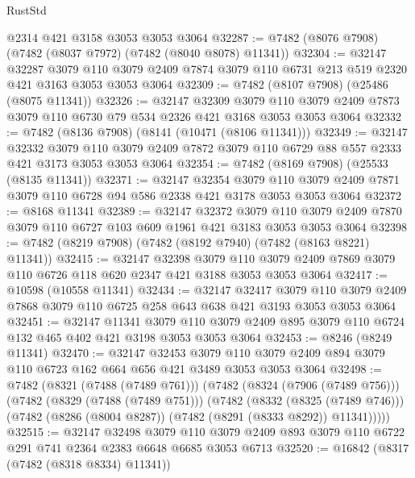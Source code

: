 \begin{lexlean}{RustStd}
\begin{coremodule}
{\begin{coremodule}
{{{{{{{{{{{{{{{{{{{{{{{{{{{{{{{{    @2314
    @421
    @3158
    @3053
    @3053
    @3064
@32287 := @7482 (@8076 @7908) (@7482 (@8037 @7972) (@7482 (@8040 @8078) @11341))
@32304 := @32147
    @32287
    @3079
    @110
    @3079
    @2409
    @7874
    @3079
    @110
    @6731
    @213
    @519
    @2320
    @421
    @3163
    @3053
    @3053
    @3064
@32309 := @7482 (@8107 @7908) (@25486 (@8075 @11341))
@32326 := @32147
    @32309
    @3079
    @110
    @3079
    @2409
    @7873
    @3079
    @110
    @6730
    @79
    @534
    @2326
    @421
    @3168
    @3053
    @3053
    @3064
@32332 := @7482 (@8136 @7908) (@8141 (@10471 (@8106 @11341)))
@32349 := @32147
    @32332
    @3079
    @110
    @3079
    @2409
    @7872
    @3079
    @110
    @6729
    @88
    @557
    @2333
    @421
    @3173
    @3053
    @3053
    @3064
@32354 := @7482 (@8169 @7908) (@25533 (@8135 @11341))
@32371 := @32147
    @32354
    @3079
    @110
    @3079
    @2409
    @7871
    @3079
    @110
    @6728
    @94
    @586
    @2338
    @421
    @3178
    @3053
    @3053
    @3064
@32372 := @8168 @11341
@32389 := @32147
    @32372
    @3079
    @110
    @3079
    @2409
    @7870
    @3079
    @110
    @6727
    @103
    @609
    @1961
    @421
    @3183
    @3053
    @3053
    @3064
@32398 := @7482 (@8219 @7908) (@7482 (@8192 @7940) (@7482 (@8163 @8221) @11341))
@32415 := @32147
    @32398
    @3079
    @110
    @3079
    @2409
    @7869
    @3079
    @110
    @6726
    @118
    @620
    @2347
    @421
    @3188
    @3053
    @3053
    @3064
@32417 := @10598 (@10558 @11341)
@32434 := @32147
    @32417
    @3079
    @110
    @3079
    @2409
    @7868
    @3079
    @110
    @6725
    @258
    @643
    @638
    @421
    @3193
    @3053
    @3053
    @3064
@32451 := @32147
    @11341
    @3079
    @110
    @3079
    @2409
    @895
    @3079
    @110
    @6724
    @132
    @465
    @402
    @421
    @3198
    @3053
    @3053
    @3064
@32453 := @8246 (@8249 @11341)
@32470 := @32147
    @32453
    @3079
    @110
    @3079
    @2409
    @894
    @3079
    @110
    @6723
    @162
    @664
    @656
    @421
    @3489
    @3053
    @3053
    @3064
@32498 := @7482
    (@8321 (@7488 (@7489 @761)))
    (@7482
      (@8324 (@7906 (@7489 @756)))
      (@7482
        (@8329 (@7488 (@7489 @751)))
        (@7482
          (@8332 (@8325 (@7489 @746)))
          (@7482 (@8286 (@8004 @8287)) (@7482 (@8291 (@8333 @8292)) @11341)))))
@32515 := @32147
    @32498
    @3079
    @110
    @3079
    @2409
    @893
    @3079
    @110
    @6722
    @291
    @741
    @2364
    @2383
    @6648
    @6685
    @3053
    @6713
@32520 := @16842 (@8317 (@7482 (@8318 @8334) @11341))
}}}}}}}}}}}}}}}}}}}}}}}}}}}}}}}}
\end{coremodule}}
\end{coremodule}
\end{lexlean}
